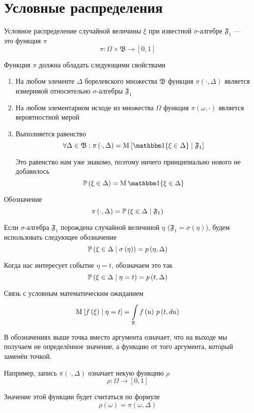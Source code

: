 \section{Условные распределения}

\begin{definition}
  Условное распределение случайной величины $\xi$
  при известной $\sigma$-алгебре $\mathfrak{F}_1$ --- это функция $\pi$
  $$\pi: \Omega \times \mathfrak{B} \rightarrow \left[ 0, 1 \right]$$
  
  Функция $\pi$ должна обладать следующими свойствами
  \begin{enumerate}
      \item На любом элементе $\Delta$ борелевского множества $\mathfrak{B}$
      функция $\pi\left( \cdot, \Delta \right)$ является измеримой
      относительно $\sigma$-алгебры $\mathfrak{F}_1$
      \item На любом элементарном исходе из множества $\Omega$
      функция $\pi\left( \omega, \cdot \right)$
      является вероятностной мерой
      \item Выполняется равенство
      $$\forall \Delta \in \mathfrak{B}: \pi\left( \cdot, \Delta \right)
      = \Mean{\Indicator{\xi \in \Delta} \mcond \mathfrak{F}_1}$$

      Это равенство нам уже знакомо, поэтому ничего принципиально нового
      не добавилось
      $$\probability{\xi \in \Delta} = \mean{\Indicator{\xi \in \Delta}}$$
  \end{enumerate}

  Обозначение
  $$\pi\left( \cdot, \Delta \right)
      = \probability{\xi \in \Delta \mcond \mathfrak{F}_1}$$

  Если $\sigma$-алгебра $\mathfrak{F}_1$ порождена случайной величиной
  $\eta$ ($\mathfrak{F}_1 = \sigma\left( \eta \right)$), будем использовать
  следующее обозначение
  $$\probability{\xi \in \Delta \mcond \sigma\left( \eta \right)}
      = \pdf{\eta, \Delta}$$

  Когда нас интересует событие $\eta = t$, обозначаем это так
  $$\probability{\xi \in \Delta \mcond \eta = t} = \pdf{t, \Delta}$$

  Связь с условным математическим ожиданием
  $$\Mean{f\left( \xi \right) \mcond \eta = t}
      = \integrall{\mathbb{R}}{\pdf{t, du}}{f\left( u \right)}$$
\end{definition}

\begin{remark}
  В обозначениях выше точка вместо аргумента означает,
  что на выходе мы получаем не определённое значение,
  а функцию от того аргумента, который заменён точкой.

  Например, запись $\pi\left( \cdot, \Delta \right)$
  означает некую функцию $\rho$
      $$\rho: \Omega \rightarrow \left[ 0, 1 \right]$$

  Значение этой функции будет считаться по формуле
      $$\rho\left( \omega \right) = \pi\left( \omega, \Delta \right)$$
\end{remark}

